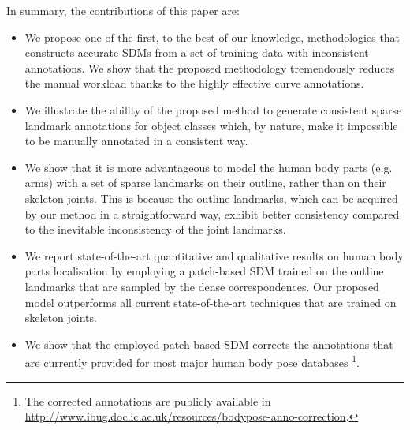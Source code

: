 In summary, the contributions of this paper are:
\begin{itemize}

  \item We propose one of the first, to the best of our knowledge, methodologies that constructs accurate SDMs from a set of training data with inconsistent annotations. We show that the proposed methodology tremendously reduces the manual workload thanks to the highly effective curve annotations.

  \item We illustrate the ability of the proposed method to generate consistent sparse landmark annotations for object classes which, by nature, make it impossible to be manually annotated in a consistent way.

  \item We show that it is more advantageous to model the human body parts (e.g. arms) with a set of sparse landmarks on their outline, rather than on their skeleton joints. This is because the outline landmarks, which can be acquired by our method in a straightforward way, exhibit better consistency compared to the inevitable inconsistency of the joint landmarks.

  \item We report state-of-the-art quantitative and qualitative results on human body parts localisation by employing a patch-based SDM trained on the outline landmarks that are sampled by the dense correspondences. Our proposed model outperforms all current state-of-the-art techniques that are trained on skeleton joints.

  \item We show that the employed patch-based SDM corrects the annotations that are currently provided for most major human body pose databases \footnote{\label{foot:annotations}The corrected annotations are publicly available in \url{http://www.ibug.doc.ic.ac.uk/resources/bodypose-anno-correction}.}.

\end{itemize}








